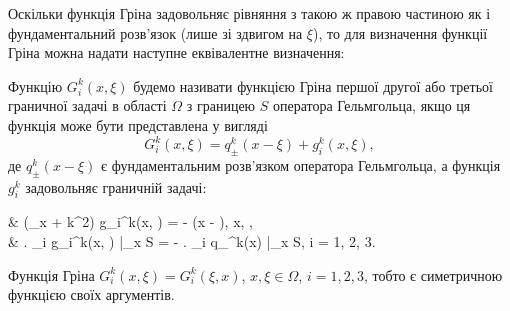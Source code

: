 Оскільки функція Гріна задовольняє рівняння з такою ж правою частиною як і фундаментальний розв'язок (лише зі здвигом на $\xi$), то для визначення функції Гріна можна надати наступне еквівалентне визначення:
\begin{definition}
	Функцію $G_i^k(x, \xi)$ будемо називати функцією Гріна першої другої або третьої граничної задачі в області $\Omega$ з границею $S$ оператора Гельмгольца, якщо ця функція  може бути представлена у вигляді
	\begin{equation}
		G_i^k(x, \xi) = q_\pm^k(x - \xi) + g_i^k(x, \xi),
	\end{equation}
	де $q_\pm^k(x - \xi)$ є фундаментальним розв'язком оператора Гельмгольца, а функція $g_i^k$ задовольняє граничній задачі: 
	\begin{system}
		& (\Delta_x + k^2) g_i^k(x, \xi) = - \delta(x - \xi), \quad x, \xi \in \Omega, \\
		& \left. \ell_i g_i^k(x, \xi) \right|_{x \in S} = - \left. \ell_i q_\pm^k(x) \right|_{x \in S}, \quad i = 1, 2, 3.
	\end{system}
\end{definition}

\begin{proposition}
	Функція Гріна $G_i^k(x, \xi) = G_i^k(\xi, x)$, $x, \xi \in \Omega$, $i = 1, 2, 3$, тобто є симетричною функцією своїх аргументів.
\end{proposition}

